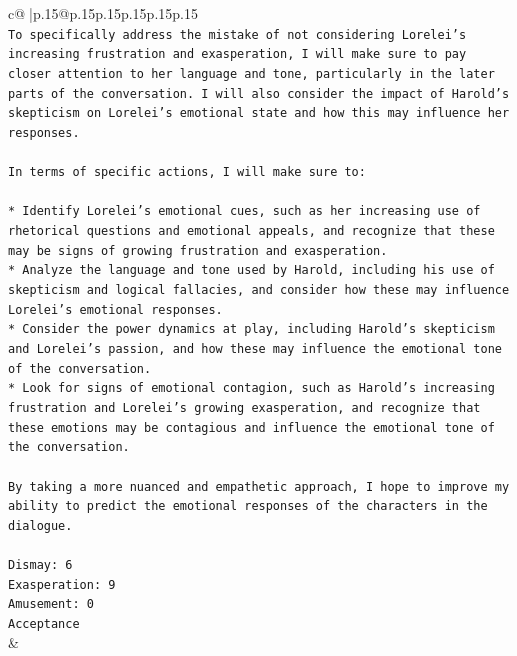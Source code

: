 \documentclass{article}
\begin{document}
{\begin{supertabular}{c@{$\;$}|p{.15\linewidth}@{}p{.15\linewidth}p{.15\linewidth}p{.15\linewidth}p{.15\linewidth}p{.15\linewidth}}
{{{\\ 
\texttt{To specifically address the mistake of not considering Lorelei's increasing frustration and exasperation, I will make sure to pay closer attention to her language and tone, particularly in the later parts of the conversation. I will also consider the impact of Harold's skepticism on Lorelei's emotional state and how this may influence her responses.} \\
\\ 
\texttt{In terms of specific actions, I will make sure to:} \\
\\ 
\texttt{* Identify Lorelei's emotional cues, such as her increasing use of rhetorical questions and emotional appeals, and recognize that these may be signs of growing frustration and exasperation.} \\
\texttt{* Analyze the language and tone used by Harold, including his use of skepticism and logical fallacies, and consider how these may influence Lorelei's emotional responses.} \\
\texttt{* Consider the power dynamics at play, including Harold's skepticism and Lorelei's passion, and how these may influence the emotional tone of the conversation.} \\
\texttt{* Look for signs of emotional contagion, such as Harold's increasing frustration and Lorelei's growing exasperation, and recognize that these emotions may be contagious and influence the emotional tone of the conversation.} \\
\\ 
\texttt{By taking a more nuanced and empathetic approach, I hope to improve my ability to predict the emotional responses of the characters in the dialogue.} \\
\\ 
\texttt{Dismay: 6} \\
\texttt{Exasperation: 9} \\
\texttt{Amusement: 0} \\
\texttt{Acceptance} \\
            }
        }
    }
    & \\ \\

\end{supertabular}
}
\end{document}
